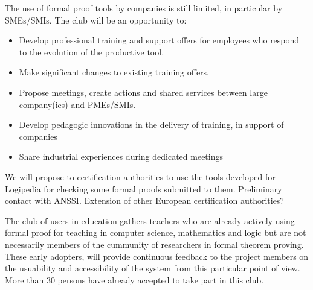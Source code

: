 \begin{workpackage}[id=dissemination,type=MGT,
  short={Dissemination, communication and exploitation},
  title={Dissemination, communication and exploitation},
  lead=Inr]
\begin{tasklist}
  \begin{task}[id=industrial-club,
    title=Expanding the use of Logipedia in the industry,
    lead=Irt,IrtRM=2]
    The use of formal proof tools by companies is still limited, in particular by SMEs/SMIs. The club will be an opportunity to:
    \begin{itemize}
    \item Develop professional training and support offers for employees who respond to the evolution of the productive tool.
    \item Make significant changes to existing training offers.
    \item Propose meetings, create actions and shared services between large company(ies) and PMEs/SMIs.
    \item Develop pedagogic innovations in the delivery of training, in support of companies
    \item Share industrial experiences during dedicated meetings
    \end{itemize}
  \end{task}



  \begin{task}[id=certif-club,
      title=Expanding the use of Logipedia within certification authorities,
      lead=Imt,ImtRM=2]
    We will propose to certification authorities to use the tools
    developed for Logipedia for checking some formal proofs submitted
    to them. Preliminary contact with ANSSI. Extension of other
    European certification authorities?
  \end{task}

  \begin{task}[id=teachers-club,
      title=Expanding the use of Logipedia in education,
      lead=Str,StrRM=2] The club of users in education gathers
    teachers who are already actively using formal proof for teaching
    in computer science, mathematics and logic but are not necessarily
    members of the cummunity of researchers in formal theorem
    proving. These early adopters, will provide continuous feedback to
    the project members on the usuability and accessibility of the
    system from this particular point of view.  More than 30 persons
    have already accepted to take part in this club.


\end{task}
\end{tasklist}
\end{workpackage}
